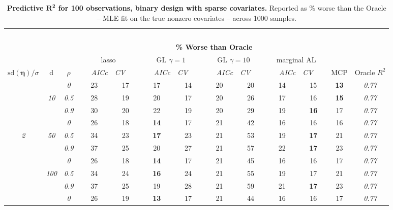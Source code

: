 \begin{table}
\vspace{-.2cm}
\footnotesize
\caption{ 
	{\bf  Predictive $\boldsymbol{R^2}$ for 100 observations, 
	binary design with sparse covariates.}
  Reported as  \% worse than the Oracle 
  -- MLE fit on the true nonzero covariates -- 
  across 1000 samples.}
\begin{center}
\begin{tabular}{ccc|cc|cc|cc|cc|c|c}
\hline &&&\multicolumn{9}{|c|}{~}\\[-1ex]
\multicolumn{3}{c}{~}&\multicolumn{9}{|c|}{\bf \% Worse than Oracle } &   \\[1ex]
& &
& \multicolumn{2}{c}{lasso} 
& \multicolumn{2}{c}{GL $\gamma=1$} 
& \multicolumn{2}{c}{GL $\gamma=10$} 
& \multicolumn{2}{c}{marginal AL} 
& \multicolumn{1}{c|}{~} & \\[-0.5ex]
$\mathrm{sd}(\boldsymbol{\eta})/\sigma$ & {\sf d} & $\rho$ 
& ~~~\scriptsize\it AICc & \multicolumn{1}{c}{\scriptsize\it CV~~~}
& ~~~\scriptsize\it AICc & \multicolumn{1}{c}{\scriptsize\it CV~~~}
& ~~~\scriptsize\it AICc & \multicolumn{1}{c}{\scriptsize\it CV~~~}
& ~~~\scriptsize\it AICc & \multicolumn{1}{c}{\scriptsize\it CV~~~} 
& \multicolumn{1}{c|}{ MCP} & Oracle $R^2$ \\[.5ex]
\hline\rule{0pt}{3ex}
& & \it  0  & 23 & 17 & 17 & 14 & 20 & 20 & 14 & 15 & {\bf 13} & \it  0.77 \\
 & \it  10  & \it  0.5  & 28 & 19 & 20 & 17 & 20 & 26 & 17 & 16 & {\bf 15} & \it  0.77 \\
& & \it  0.9  & 30 & 20 & 22 & 19 & 20 & 29 & 19 & {\bf 16} & 17 & \it  0.77 \\[1ex]
\cline{2-3}\rule{0pt}{3ex}
& & \it  0  & 26 & 18 & {\bf 14} & 17 & 21 & 42 & 16 & 16 & 16 & \it  0.77 \\
\it  2  & \it  50  & \it  0.5  & 34 & 23 & {\bf 17} & 23 & 21 & 53 & 19 & {\bf 17} & 21 & \it  0.77 \\
& & \it  0.9  & 37 & 25 & 20 & 27 & 21 & 57 & 22 & {\bf 17} & 23 & \it  0.77 \\[1ex]
\cline{2-3}\rule{0pt}{3ex}
& & \it  0  & 26 & 18 & {\bf 14} & 17 & 21 & 45 & 16 & 16 & 17 & \it  0.77 \\
 & \it  100  & \it  0.5  & 34 & 24 & {\bf 16} & 24 & 21 & 55 & 19 & 17 & 21 & \it  0.77 \\
& & \it  0.9  & 37 & 25 & 19 & 28 & 21 & 59 & 21 & {\bf 17} & 23 & \it  0.77 \\[1ex]
\cline{2-3}\rule{0pt}{3ex}
& & \it  0  & 26 & 19 & {\bf 13} & 17 & 21 & 44 & 16 & 16 & 17 & \it  0.77 \\

\end{tabular}
\end{center}
\end{table}
